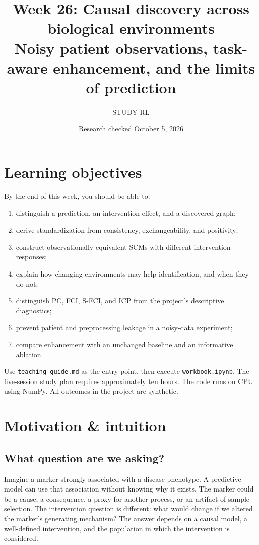 \documentclass[11pt,oneside]{scrbook}
\title{\color{rlblue}\textbf{Week 26: Causal discovery across biological environments}\\\large Noisy patient observations, task-aware enhancement, and the limits of prediction}
\author{STUDY-RL}
\date{Research checked October 5, 2026}
\begin{document}
\maketitle
\tableofcontents

\chapter*{Learning objectives}
\begin{keyidea}
By the end of this week, you should be able to:
\begin{enumerate}
\item distinguish a prediction, an intervention effect, and a discovered graph;
\item derive standardization from consistency, exchangeability, and positivity;
\item construct observationally equivalent SCMs with different intervention responses;
\item explain how changing environments may help identification, and when they do not;
\item distinguish PC, FCI, S-FCI, and ICP from the project's descriptive diagnostics;
\item prevent patient and preprocessing leakage in a noisy-data experiment;
\item compare enhancement with an unchanged baseline and an informative ablation.
\end{enumerate}
\end{keyidea}
Use \texttt{teaching\_guide.md} as the entry point, then execute
\texttt{workbook.ipynb}. The five-session study plan requires approximately ten hours.
The code runs on CPU using NumPy. All outcomes in the project are synthetic.

\chapter{Motivation \& intuition}
\section{What question are we asking?}
Imagine a marker strongly associated with a disease phenotype. A predictive model can
use that association without knowing why it exists. The marker could be a cause, a
consequence, a proxy for another process, or an artifact of sample selection.
The intervention question is different: what would change if we altered the marker's
generating mechanism? The answer depends on a causal model, a well-defined intervention,
and the population in which the intervention is considered.
\end{document}
